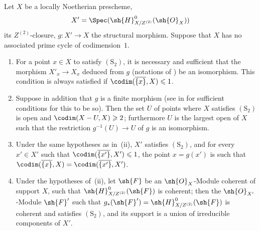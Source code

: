\begin{proposition}[5.10.16]
\label{IV.5.10.16}
Let $X$ be a locally Noetherian prescheme,
\[
  X'=\Spec(\sh{H}^0_{X/Z^{(2)}}(\sh{O}_X))
\]
its $Z^{(2)}$-closure, $g:X'\to X$ the structural morphism.
Suppose that $X$ has no associated prime cycle of codimension~$1$.
\begin{enumerate}[label=\emph{\roman*)}]
  \item For a point $x\in X$ to satisfy $(\mathrm{S}_2)$, it is necessary and sufficient that the morphism $X'_x\to X_x$ deduced from $g$ (notations of ) be an isomorphism.
This condition is always satisfied if $\codim(\overline{\{x\}},X)\leqslant 1$.
  \item Suppose in addition that $g$ is a finite morphism (see in  for sufficient conditions for this to be so).
Then the set $U$ of points where $X$ satisfies $(\mathrm{S}_2)$ is open and $\codim(X-U,X)\geqslant 2$; furthermore $U$ is the largest open of $X$ such that the restriction $g^{-1}(U)\to U$ of $g$ is an isomorphism.
  \item Under the same hypotheses as in~(ii), $X'$ satisfies $(\mathrm{S}_2)$, and for every $x'\in X'$ such that $\codim(\overline{\{x'\}},X')\leqslant 1$, the point $x=g(x')$ is such that $\codim(\overline{\{x\}},X)=\codim(\overline{\{x'\}},X')$.
  \item Under the hypotheses of~(ii), let $\sh{F}$ be an $\sh{O}_X$-Module coherent of support $X$, such that $\sh{H}^0_{X/Z^{(2)}}(\sh{F})$ is coherent; then the $\sh{O}_{X'}$-Module $\sh{F}'$ such that $g_*(\sh{F}')=\sh{H}^0_{X/Z^{(2)}}(\sh{F})$ is coherent and satisfies $(\mathrm{S}_2)$, and its support is a union of irreducible components of $X'$.
\end{enumerate}
\end{proposition}

